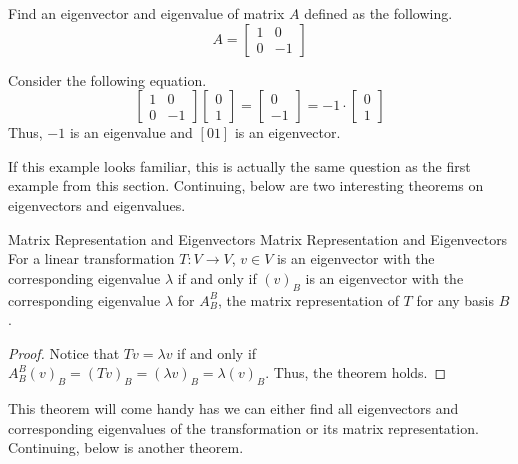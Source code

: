 \documentclass[../main.tex]{subfiles}
\begin{document}
\begin{problem}
Find an eigenvector and eigenvalue of matrix $A$ defined as the
following.
\[
A =
\begin{bmatrix}
    1 & 0 \\
    0 & -1
\end{bmatrix}
\]
\end{problem}
\begin{solution}
Consider the following equation.
\[
\begin{bmatrix}
    1 & 0 \\
    0 & -1
\end{bmatrix}
\begin{bmatrix}
    0 \\
    1
\end{bmatrix}
=
\begin{bmatrix}
    0 \\
    -1
\end{bmatrix}
=
-1 \cdot
\begin{bmatrix}
    0 \\
    1
\end{bmatrix}
\]
Thus, $-1$ is an eigenvalue and $[0 1]$ is an eigenvector.
\end{solution}

If this example looks familiar, this is actually the same question
as the first example from this section. Continuing, below are
two interesting theorems on eigenvectors and eigenvalues.

\begin{theorem}{Matrix Representation and Eigenvectors}
{Matrix Representation and Eigenvectors}
For a linear transformation $T: V \to V$, $v \in V$ is an
eigenvector with the corresponding eigenvalue $\lambda$ if and only if
$(v)_B$ is an eigenvector with the corresponding eigenvalue $\lambda$
for $A_B^B$, the matrix representation of $T$ for any basis $B$.
\end{theorem}
\begin{proof}
Notice that $Tv = \lambda v$ if and only if $A_B^B (v)_B = (Tv)_B =
(\lambda v)_B = \lambda (v)_B$. Thus, the theorem holds.
\end{proof}

This theorem will come handy has we can either find all eigenvectors
and corresponding eigenvalues of the transformation or its matrix
representation. Continuing, below is another theorem.
\end{document}

